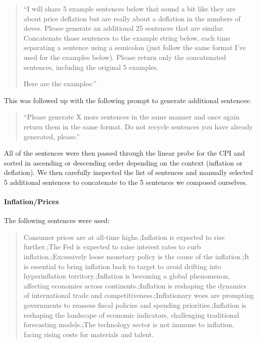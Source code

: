 \begin{quote}
  ``I will share 5 example sentences below that sound a bit like they are about price deflation but are really about a deflation in the numbers of doves. Please generate an additional 25 sentences that are similar. Concatenate those sentences to the example string below, each time separating a sentence using a semicolon (just follow the same format I've used for the examples below). Please return only the concatenated sentences, including the original 5 examples. 

  Here are the examples:''
\end{quote}

This was followed up with the following prompt to generate additional sentences:

\begin{quote}
  ``Please generate X more sentences in the same manner and once again return them in the same format. Do not recycle sentences you have already generated, please.''
\end{quote}

All of the sentences were then passed through the linear probe for the CPI and sorted in ascending or descending order depending on the context (inflation or deflation). We then carefully inspected the list of sentences and manually selected 5 additional sentences to concatenate to the 5 sentences we composed ourselves.

\paragraph{Inflation/Prices}

The following sentences were used:

\begin{quote}
  Consumer prices are at all-time highs.;Inflation is expected to rise further.;The Fed is expected to raise interest rates to curb inflation.;Excessively loose monetary policy is the cause of the inflation.;It is essential to bring inflation back to target to avoid drifting into hyperinflation territory.;Inflation is becoming a global phenomenon, affecting economies across continents.;Inflation is reshaping the dynamics of international trade and competitiveness.;Inflationary woes are prompting governments to reassess fiscal policies and spending priorities.;Inflation is reshaping the landscape of economic indicators, challenging traditional forecasting models.;The technology sector is not immune to inflation, facing rising costs for materials and talent.
\end{quote}

